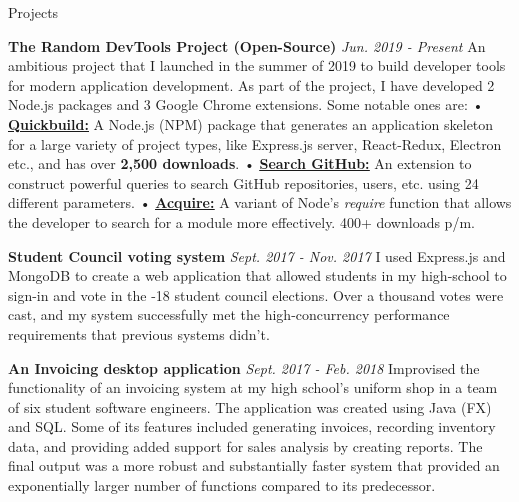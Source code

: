 \documentclass{resume}
\begin{document}
\begin{rSection}{\small{Projects}}

{\bf \footnotesize The Random DevTools Project (Open-Source)} \hfill {\footnotesize{\textit{Jun. 2019 - Present}}}\newline
\footnotesize{An ambitious project that I launched in the summer of 2019 to build developer tools for modern application development. As part of the project, I have developed 2 Node.js packages and 3 Google Chrome extensions. Some notable ones are:}\newline
\footnotesize{ • \textbf{\href{https://www.npmjs.com/package/quickbuild}{\underline{Quickbuild:}}} A Node.js (NPM) package that generates an application skeleton for a large variety of project types, like Express.js server, React-Redux, Electron etc., and has over \textbf{2,500 downloads}.}\newline
\footnotesize{ • \textbf{\href{https://chrome.google.com/webstore/detail/search-github/fbdfmneommmclhkndkhdagkcebgekkna}{\underline{Search GitHub:}}} An extension to construct powerful queries to search GitHub repositories, users, etc. using 24 different parameters.\newline}
\footnotesize{ • \textbf{\href{https://npmjs.com/package/acquire-module}{\underline{Acquire:}}} A variant of Node's \textit{require} function that allows the developer to search for a module more effectively. 400+ downloads p/m.}

{\bf \footnotesize Student Council voting system} \hfill {\footnotesize{\textit{Sept. 2017 - Nov. 2017}}}\newline
\footnotesize{I used Express.js and MongoDB to create a web application that allowed students in my high-school to sign-in and vote in the -18 student council elections. Over a thousand votes were cast, and my system successfully met the high-concurrency performance requirements that previous systems didn't. }

{\bf \footnotesize An Invoicing desktop application} \hfill {\footnotesize{\textit{Sept. 2017 - Feb. 2018}}}\newline
\footnotesize{Improvised the functionality of an invoicing system at my high school’s uniform shop in a team of six student software engineers. The application was created using Java (FX) and SQL. Some of its features included generating invoices, recording inventory data, and providing added support for sales analysis by creating reports. The final output was a more robust and substantially faster system that provided an exponentially larger number of functions compared to its predecessor.}

\end{rSection}
\end{document}
